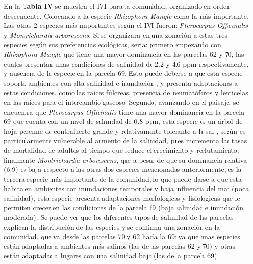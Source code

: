 \documentclass[conference,final,12pt,]{IEEEtran}
\begin{document}
En la \textbf{Tabla IV} se muestra el IVI para la comunidad, 
organizado en orden descendente. Colocando a la especie \emph{Rhizophora Mangle} como la más importante. Las otras
2 especies más importantes según el IVI fueron: \emph{Pterocarpus
Officinalis} y \emph{Montrichardia arborescens}. Si se organizara en una
zonación a estas tres especies según sus preferencias ecológicas, seria:
primero empezando con \emph{Rhizophora Mangle} que tiene una mayor
dominancia en las parcelas 62 y 70, las cuales presentan unas
condiciones de salinidad de 2.2 y 4.6 ppm respectivamente, y ausencia
de la especie en la parcela 69. Esto puede deberse a que esta especie
soporta ambientes con alta salinidad e inundación \citep{AF}, y presenta
adaptaciones a estas condiciones, como las raíces fúlcreas, presencia de
neumatóforos \citep{AF} y lenticelas en las raíces para el intercambio
gaseoso. Segundo, avanzando en el paisaje, se encuentra que
\emph{Pterocarpus Officinalis} tiene una mayor dominancia en la parcela
69 que cuenta con un nivel de salinidad de 0.8 ppm, esta especie es un
árbol de hoja perenne de contrafuerte grande y relativamente tolerante a
la sal \citep{AG}, según \citep{AH} es particularmente vulnerable al
aumento de la salinidad, pues incrementa las tasas de mortalidad de
adultos al tiempo que reduce el crecimiento y reclutamiento;
finalmente \emph{Montrichardia arborescens}, que a pesar de que su
dominancia relativa (6.9) es baja respecto a las otras dos especies
mencionadas anteriormente, es la tercera especie más importante de la
comunidad, lo que puede darse a que esta habita en ambientes con
inundaciones temporales y baja influencia del mar (poca salinidad), esta especie presenta adaptaciones
morfologicas y fisiologicas que le permiten crecer en las condiciones de
la parcela 69 \citep{AI} (baja salinidad e inundación moderada). Se puede ver que los diferentes tipos de salinidad de las parcelas explican la
distribución de las especies y se confirma una zonación en la comunidad,
que va desde las parcelas 70 y 62 hacía la 69; ya que unas especies están
adaptadas a ambientes más salinos (las de las parcelas 62 y 70) y otras
están adaptadas a lugares con una salinidad baja (las de la parcela 69).
\end{document}

